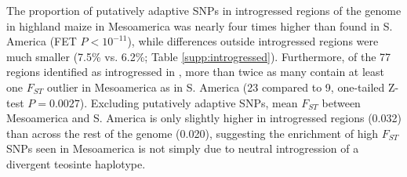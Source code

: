 The proportion of putatively adaptive SNPs in introgressed regions of the genome in highland maize in Mesoamerica was nearly four times higher than found in S. America (FET $P<10^{-11}$), while differences outside introgressed regions were much smaller (7.5\% vs. 6.2\%; Table \ref{supp:introgressed}). 
Furthermore, of the 77 regions identified as introgressed in \cite{Profford_2013}, more than twice as many contain at least one $F_{ST}$ outlier in Mesoamerica as in S. America (23 compared to 9, one-tailed Z-test $P=0.0027$).
Excluding  putatively adaptive SNPs, mean $F_{ST}$ between Mesoamerica and S. America is only slightly higher in introgressed regions (0.032) than across the rest of the genome (0.020), suggesting the enrichment of high $F_{ST}$ SNPs seen in Mesoamerica is not simply due to neutral introgression of a divergent teosinte haplotype.  




    
